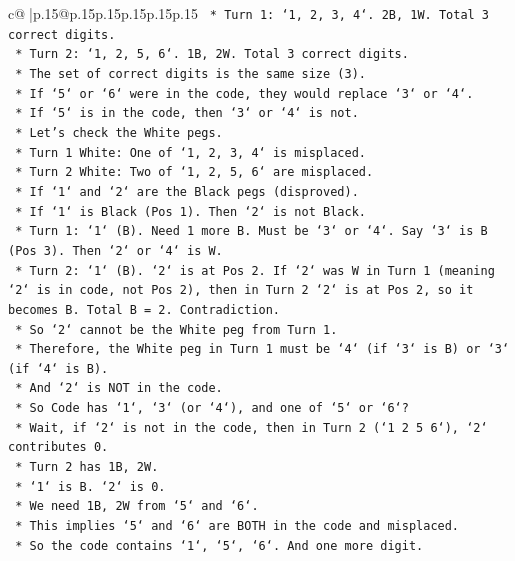 \documentclass{article}
\begin{document}
{\begin{supertabular}{c@{$\;$}|p{.15\linewidth}@{}p{.15\linewidth}p{.15\linewidth}p{.15\linewidth}p{.15\linewidth}p{.15\linewidth}}
{{{\texttt{    *   Turn 1: `1, 2, 3, 4`. 2B, 1W. Total 3 correct digits.} \\
\texttt{    *   Turn 2: `1, 2, 5, 6`. 1B, 2W. Total 3 correct digits.} \\
\texttt{    *   The set of correct digits is the same size (3).} \\
\texttt{    *   If `5` or `6` were in the code, they would replace `3` or `4`.} \\
\texttt{    *   If `5` is in the code, then `3` or `4` is not.} \\
\texttt{    *   Let's check the White pegs.} \\
\texttt{        *   Turn 1 White: One of `1, 2, 3, 4` is misplaced.} \\
\texttt{        *   Turn 2 White: Two of `1, 2, 5, 6` are misplaced.} \\
\texttt{    *   If `1` and `2` are the Black pegs (disproved).} \\
\texttt{    *   If `1` is Black (Pos 1). Then `2` is not Black.} \\
\texttt{        *   Turn 1: `1` (B). Need 1 more B. Must be `3` or `4`. Say `3` is B (Pos 3). Then `2` or `4` is W.} \\
\texttt{        *   Turn 2: `1` (B). `2` is at Pos 2. If `2` was W in Turn 1 (meaning `2` is in code, not Pos 2), then in Turn 2 `2` is at Pos 2, so it becomes B. Total B = 2. Contradiction.} \\
\texttt{        *   So `2` cannot be the White peg from Turn 1.} \\
\texttt{        *   Therefore, the White peg in Turn 1 must be `4` (if `3` is B) or `3` (if `4` is B).} \\
\texttt{        *   And `2` is NOT in the code.} \\
\texttt{        *   So Code has `1`, `3` (or `4`), and one of `5` or `6`?} \\
\texttt{        *   Wait, if `2` is not in the code, then in Turn 2 (`1 2 5 6`), `2` contributes 0.} \\
\texttt{        *   Turn 2 has 1B, 2W.} \\
\texttt{        *   `1` is B. `2` is 0.} \\
\texttt{        *   We need 1B, 2W from `5` and `6`.} \\
\texttt{        *   This implies `5` and `6` are BOTH in the code and misplaced.} \\
\texttt{        *   So the code contains `1`, `5`, `6`. And one more digit.} \\
}}}
\end{supertabular}}
\end{document}
